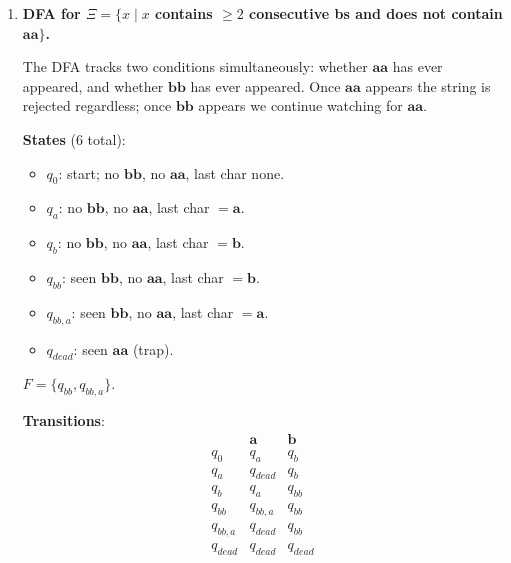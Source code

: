 \documentclass[11pt,openany]{book}
\begin{document}
\begin{enumerate}[{1.}1.]
\item \textbf{DFA for $\Xi = \{x\mid x$ contains $\geq 2$ consecutive \textbf{b}s and does not contain $\mathbf{aa}\}$.}

The DFA tracks two conditions simultaneously: whether $\mathbf{aa}$ has ever appeared, and whether $\mathbf{bb}$ has ever appeared. Once $\mathbf{aa}$ appears the string is rejected regardless; once $\mathbf{bb}$ appears we continue watching for $\mathbf{aa}$.

\medskip
\noindent\textbf{States} (6 total):
\begin{itemize}
  \item $q_0$: start; no $\mathbf{bb}$, no $\mathbf{aa}$, last char none.
  \item $q_a$: no $\mathbf{bb}$, no $\mathbf{aa}$, last char $= \mathbf{a}$.
  \item $q_b$: no $\mathbf{bb}$, no $\mathbf{aa}$, last char $= \mathbf{b}$.
  \item $q_{bb}$: seen $\mathbf{bb}$, no $\mathbf{aa}$, last char $= \mathbf{b}$.
  \item $q_{bb,a}$: seen $\mathbf{bb}$, no $\mathbf{aa}$, last char $= \mathbf{a}$.
  \item $q_{dead}$: seen $\mathbf{aa}$ (trap).
\end{itemize}
$F = \{q_{bb},  q_{bb,a}\}.$

\medskip
\noindent\textbf{Transitions}:
\[
\begin{array}{c|cc}
       & \mathbf{a}    & \mathbf{b}    \\\hline
q_0    & q_a           & q_b           \\
q_a    & q_{dead}      & q_b           \\
q_b    & q_a           & q_{bb}        \\
q_{bb} & q_{bb,a}      & q_{bb}        \\
q_{bb,a} & q_{dead}    & q_{bb}        \\
q_{dead} & q_{dead}    & q_{dead}
\end{array}
\]


\end{enumerate}
\end{document}
